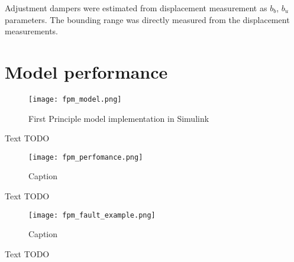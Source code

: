 Adjustment dampers were estimated from displacement measurement as $b_b$,
$b_u$ parameters. The bounding range was directly measured from the
displacement measurements.

\newpage
\section{Model performance}

\begin{figure}[ptbh!]
    \centering
    \texttt{[image: fpm\_model.png]}
    \caption{First Principle model implementation in Simulink}
    \label{fig:fpm_simulink}
\end{figure}

Text TODO

\begin{figure}[h!]
    \centering
    \texttt{[image: fpm\_perfomance.png]}
    \caption{Caption}
    \label{fig:}
\end{figure}

Text TODO

\newpage

\begin{figure}[h!]
    \centering
    \texttt{[image: fpm\_fault\_example.png]}
    \caption{Caption}
    \label{fig:}
\end{figure}

Text TODO





